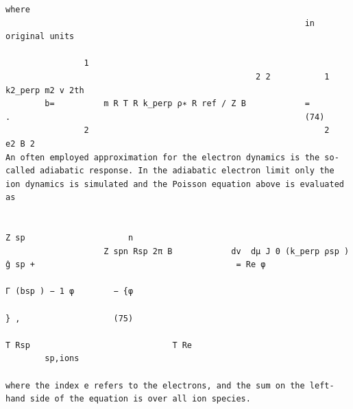 \documentclass[a4paper]{article}
\newcommand{\gkwpagefont}{\fontsize{6.0pt}{7.55pt}\selectfont}
\begin{document}
\begin{Verbatim}[fontsize=\gkwpagefont]
where
                                                             in original units
                                                                                   
                1                                  
                                                   2 2           1 k2_perp m2 v 2th
        b=          m R T R k_perp ρ∗ R ref / Z B            =                                .                                                            (74)
                2                                                2      e2 B 2
An often employed approximation for the electron dynamics is the so-called adiabatic response. In the adiabatic electron limit only the
ion dynamics is simulated and the Poisson equation above is evaluated as
                                                                                                                   
                                                                                              Z sp                     n         
                    Z spn Rsp 2π B            dv  dμ J 0 (k_perp ρsp ) ĝ sp +                                         = Re φ
                                                                                                      Γ (bsp ) − 1 φ        − {φ
                                                                                                                                } ,                   (75)
                                                                                              T Rsp                             T Re
        sp,ions

where the index e refers to the electrons, and the sum on the left-hand side of the equation is over all ion species.
\end{Verbatim}
\newpage
\end{document}

